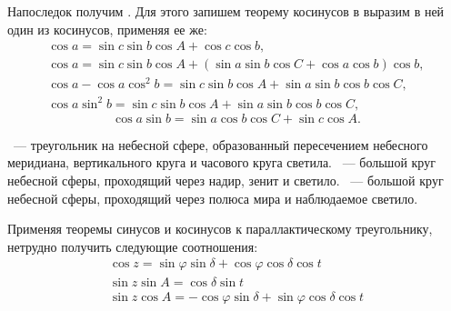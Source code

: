Напоследок получим . Для этого запишем теорему косинусов в выразим в ней один из косинусов, применяя ее же:
\begin{gather*}
	\cos a = \sin c \sin b \cos A + \cos c \cos b,\\
	\cos a = \sin c \sin b \cos A + \left( \sin a \sin b \cos C + \cos a \cos b \right)\cos b,\\
	\cos a - \cos a \cos^2 b = \sin c \sin b \cos A + \sin a \sin b \cos b \cos C,\\
	\cos a \sin^2 b = \sin c \sin b \cos A + \sin a \sin b \cos b \cos C,
\end{gather*}
\begin{equation}
	\cos a \sin b = \sin a \cos b \cos C + \sin c \cos A.
\end{equation}

~--- треугольник на небесной  сфере, образованный пересечением небесного меридиана, вертикального круга и часового круга светила. ~--- большой круг небесной сферы, проходящий через надир, зенит и светило. ~--- большой круг небесной сферы, проходящий через полюса мира и наблюдаемое светило.

Применяя теоремы синусов и косинусов к параллактическому треугольнику, нетрудно получить следующие соотношения:
\begin{gather}
	\cos z=\sin\varphi\sin\delta+\cos\varphi\cos\delta\cos t\\
	\sin z\sin A=\cos\delta\sin t\\
	\sin z\cos A=-\cos\varphi\sin\delta+\sin\varphi\cos\delta\cos t
\end{gather}
